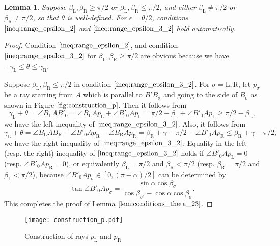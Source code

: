 \documentclass[11pt]{amsart}
\newtheorem{lemma}[theorem]{Lemma}
\numberwithin{equation}{section}
\numberwithin{theorem}{section}
\newcommand{\Lt}{\ensuremath{\mathrm{L}}}
\newcommand{\Rt}{\ensuremath{\mathrm{R}}}
\begin{document}
\begin{lemma}\label{lem:conditions_theta_23}
Suppose $\beta_\Lt ,\beta_\Rt\geqslant\pi /2$ or $\beta_\Lt ,\beta_\Rt\leqslant\pi /2$, and either $\beta_\Lt\neq\pi /2$ or $\beta_\Rt\neq\pi /2$,
so that $\theta$ is well-defined.
For $\epsilon =\theta /2$, conditions $\eqref{ineq:range_epsilon_2}$ and $\eqref{ineq:range_epsilon_3_2}$ hold automatically.
\end{lemma}
\begin{proof}
Condition $\eqref{ineq:range_epsilon_2}$, and condition $\eqref{ineq:range_epsilon_3_2}$ for $\beta_\Lt ,\beta_\Rt\geqslant\pi /2$
are obvious because we have $-\gamma_\Lt\leqslant\theta\leqslant\gamma_\Rt$.

Suppose $\beta_\Lt ,\beta_\Rt\leqslant\pi /2$ in condition $\eqref{ineq:range_epsilon_3_2}$.
For $\sigma =\Lt ,\Rt$, let $p_\sigma$ be a ray starting from $A$ which is parallel to $B'B_\sigma$ and going to the side of $B_\sigma$
as shown in Figure $\ref{fig:construction_p}$.
Then it follows from
\begin{equation}\label{ineq:B'Ap_L}
\gamma_\Lt +\theta =\angle B_\Lt AB'_0=\angle B_\Lt Ap_\Lt +\angle B'_0Ap_\Lt =\pi /2-\beta_\Lt +\angle B'_0Ap_\Lt\geqslant\pi /2-\beta_\Lt ,
\end{equation}
we have the left inequality of $\eqref{ineq:range_epsilon_3_2}$.
Also, it follows from
\begin{equation}\label{ineq:B'Ap_R}
\gamma_\Lt +\theta =\angle B_\Lt AB_\Rt -\angle B'_0 Ap_\Rt -\angle B_\Rt Ap_\Rt =\beta_\Rt +\gamma -\pi /2-\angle B'_0Ap_\Rt
\leqslant\beta_\Rt +\gamma -\pi /2,
\end{equation}
we have the right inequality of $\eqref{ineq:range_epsilon_3_2}$.
Equality in the left (resp. the right) inequality of $\eqref{ineq:range_epsilon_3_2}$ holds if $\angle B'_0Ap_\Lt =0$ (resp. $\angle B'_0Ap_\Rt =0$),
or equivalently $\beta_\Lt =\pi /2$ and $\beta_\Rt <\pi /2$ (resp. $\beta_\Rt =\pi /2$ and $\beta_\Lt <\pi /2$),
because $\angle B'_0Ap_\sigma\in [0,(\pi -\alpha )/2]$ can be determined by
\begin{equation}\label{eq:tan_B'Ap}
\tan\angle B'_0Ap_\sigma =\frac{\sin\alpha\cos\beta_\sigma}{\cos\beta_{\sigma'}-\cos\alpha\cos\beta_\sigma}.
\end{equation}
This completes the proof of Lemma $\ref{lem:conditions_theta_23}$.
\end{proof}
\begin{figure}[htbp]
\addtocounter{theorem}{1}
\centering\texttt{[image: construction\_p.pdf]}
    \caption{Construction of rays $p_\Lt$ and $p_\Rt$}
    \label{fig:construction_p}
\end{figure}
\end{document}
